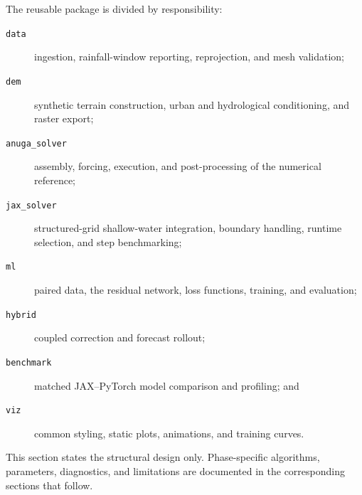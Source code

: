 The reusable package is divided by responsibility:

\begin{description}
    \item[\texttt{data}] ingestion, rainfall-window reporting, reprojection,
    and mesh validation;
    \item[\texttt{dem}] synthetic terrain construction, urban and
    hydrological conditioning, and raster export;
    \item[\texttt{anuga\_solver}] assembly, forcing, execution, and
    post-processing of the numerical reference;
    \item[\texttt{jax\_solver}] structured-grid shallow-water integration,
    boundary handling, runtime selection, and step benchmarking;
    \item[\texttt{ml}] paired data, the residual network, loss functions,
    training, and evaluation;
    \item[\texttt{hybrid}] coupled correction and forecast rollout;
    \item[\texttt{benchmark}] matched JAX--PyTorch model comparison and
    profiling; and
    \item[\texttt{viz}] common styling, static plots, animations, and training
    curves.
\end{description}

This section states the structural design only.  Phase-specific algorithms,
parameters, diagnostics, and limitations are documented in the corresponding
sections that follow.
